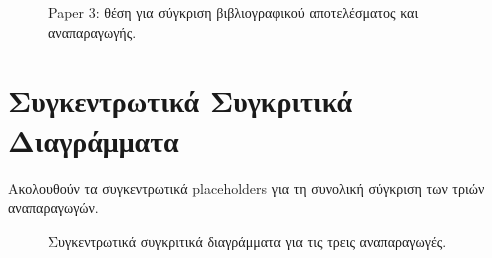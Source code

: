 \documentclass[11pt,a4paper]{report}
\begin{document}
\begin{figure}[H]
\centering
\begin{subfigure}[t]{0.31\textwidth}
\centering
{}
\end{subfigure}
\hfill
\begin{subfigure}[t]{0.31\textwidth}
\centering
{}
\end{subfigure}
\hfill
\begin{subfigure}[t]{0.31\textwidth}
\centering
{}
\end{subfigure}
\caption{Paper 3: θέση για σύγκριση βιβλιογραφικού αποτελέσματος και αναπαραγωγής.}
\label{fig:ch3-paper3-placeholder}
\end{figure}

\section{Συγκεντρωτικά Συγκριτικά Διαγράμματα}

Ακολουθούν τα συγκεντρωτικά placeholders για τη συνολική σύγκριση των τριών αναπαραγωγών.

\begin{figure}[H]
\centering
\begin{subfigure}[t]{0.48\textwidth}
\centering
{}
\end{subfigure}
\hfill
\begin{subfigure}[t]{0.48\textwidth}
\centering
{}
\end{subfigure}
\caption{Συγκεντρωτικά συγκριτικά διαγράμματα για τις τρεις αναπαραγωγές.}
\label{fig:ch3-summary-placeholders}
\end{figure}
\end{document}
